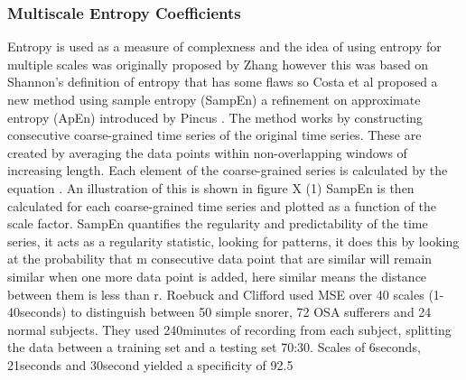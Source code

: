 \subsubsection{Multiscale Entropy Coefficients}
Entropy is used as a measure of complexness and the idea of using entropy for multiple scales was originally proposed by Zhang however this was based on Shannon’s definition of entropy that has some flaws so Costa et al proposed a new method using sample entropy (SampEn) a refinement on approximate entropy (ApEn) introduced by Pincus .
The method works by constructing consecutive coarse-grained time series of the original time series. These are created by averaging the data points within non-overlapping windows of increasing length. Each element of the coarse-grained series is calculated by the equation . An illustration of this is shown in figure X (1)
SampEn is then calculated for each coarse-grained time series and plotted as a function of the scale factor. SampEn quantifies the regularity and predictability of the time series, it acts as a regularity statistic, looking for patterns, it does this by looking at the probability that m consecutive data point that are similar will remain similar when one more data point is added, here similar means the distance between them is less than r. 
Roebuck and Clifford used MSE over 40 scales (1-40seconds) to distinguish between 50 simple snorer, 72 OSA sufferers and 24 normal subjects. They used 240minutes of recording from each subject, splitting the data between a training set and a testing set 70:30. Scales of 6seconds, 21seconds and 30second yielded a specificity of 92.5%

